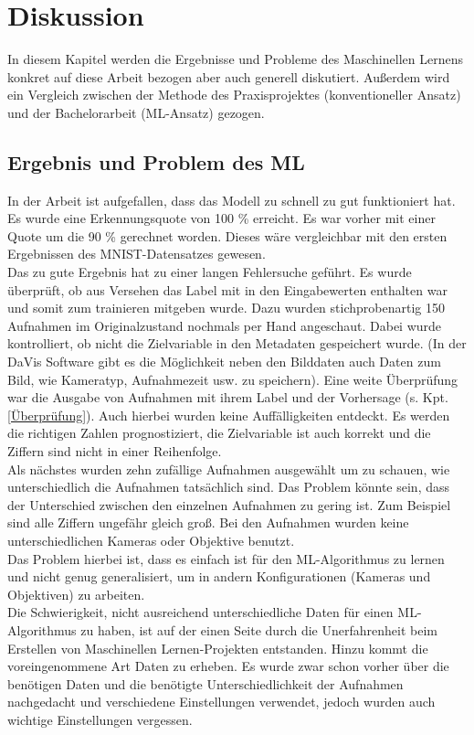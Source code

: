 \section{Diskussion} \label{Kapitel: Diskussion}
In diesem Kapitel werden die Ergebnisse und Probleme des Maschinellen Lernens konkret auf diese Arbeit bezogen aber auch generell diskutiert.  Außerdem wird ein Vergleich zwischen der Methode des Praxisprojektes (konventioneller Ansatz) und  der Bachelorarbeit (ML-Ansatz) gezogen.
\subsection{Ergebnis und Problem des ML}
In der Arbeit ist aufgefallen, dass das Modell zu schnell zu gut funktioniert hat. Es wurde eine Erkennungsquote von 100 \% erreicht.  Es war vorher mit einer Quote um die 90 \% gerechnet worden. Dieses wäre vergleichbar mit den ersten Ergebnissen des MNIST-Datensatzes gewesen.\\
Das zu gute Ergebnis hat zu einer langen Fehlersuche geführt. Es wurde überprüft, ob aus Versehen das Label mit in den Eingabewerten enthalten war und somit zum trainieren mitgeben wurde.  Dazu wurden stichprobenartig 150 Aufnahmen im Originalzustand nochmals per Hand angeschaut. Dabei wurde kontrolliert, ob nicht die Zielvariable in den Metadaten gespeichert wurde. (In der DaVis Software gibt es die Möglichkeit neben den Bilddaten auch Daten zum Bild, wie Kameratyp, Aufnahmezeit usw. zu speichern). Eine weite Überprüfung war die Ausgabe von Aufnahmen mit ihrem Label und der Vorhersage (s.  Kpt. \ref{Überprüfung}). Auch hierbei wurden keine Auffälligkeiten entdeckt. Es werden die richtigen Zahlen prognostiziert,  die Zielvariable ist auch korrekt und die Ziffern sind nicht in einer Reihenfolge.\\
Als nächstes wurden zehn zufällige Aufnahmen ausgewählt um zu schauen, wie unterschiedlich die Aufnahmen tatsächlich sind. Das Problem könnte sein, dass der Unterschied zwischen den einzelnen Aufnahmen zu gering ist.  Zum Beispiel sind alle Ziffern ungefähr gleich groß. Bei den Aufnahmen wurden keine unterschiedlichen Kameras oder Objektive benutzt. \\
Das Problem hierbei ist, dass es einfach ist für den ML-Algorithmus zu lernen und nicht genug generalisiert,  um in andern Konfigurationen (Kameras und Objektiven) zu arbeiten.  \\
Die Schwierigkeit, nicht ausreichend unterschiedliche Daten für einen ML-Algorithmus zu haben,  ist auf der einen Seite durch die Unerfahrenheit beim Erstellen von Maschinellen Lernen-Projekten entstanden. Hinzu kommt die voreingenommene Art Daten zu erheben. Es wurde zwar schon vorher über die benötigen Daten und die benötigte Unterschiedlichkeit der Aufnahmen nachgedacht und verschiedene Einstellungen verwendet, jedoch wurden auch wichtige Einstellungen vergessen.\\
